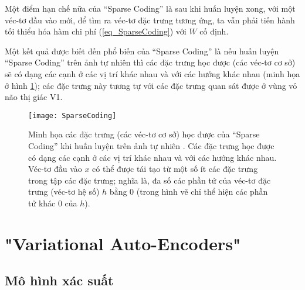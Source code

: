 Một điểm hạn chế nữa của ``Sparse Coding'' là sau khi huấn luyện xong, với một véc-tơ đầu vào mới, để tìm ra véc-tơ đặc trưng tương ứng, ta vẫn phải tiến hành tối thiểu hóa hàm chi phí (\ref{eq_SparseCoding}) với $W$ cố định.

Một kết quả được biết đến phổ biến của ``Sparse Coding'' là nếu huấn luyện ``Sparse Coding'' trên ảnh tự nhiên thì các đặc trưng học được (các véc-tơ cơ sở) sẽ có dạng các cạnh  ở các vị trí khác nhau và với các hướng khác nhau (minh họa ở hình \ref{fig_SparseCoding}); các đặc trưng này tương tự với các đặc trưng quan sát được ở vùng vỏ não thị giác V1. 

\begin{figure} 
	\centering
	\texttt{[image: SparseCoding]}
	\caption[Minh họa các đặc trưng học được của ``Sparse Coding'' khi huấn luyện trên ảnh tự nhiên]{Minh họa các đặc trưng (các véc-tơ cơ sở) học được của ``Sparse Coding'' khi huấn luyện trên ảnh tự nhiên \cite{zeiler2014thesis}. Các đặc trưng học được có dạng các cạnh ở các vị trí khác nhau và với các hướng khác nhau. Véc-tơ đầu vào $x$ có thể được tái tạo từ một số ít các đặc trưng trong tập các đặc trưng; nghĩa là, đa số các phần tử của véc-tơ đặc trưng (véc-tơ hệ số) $h$ bằng 0 (trong hình vẽ chỉ thể hiện các phần tử khác 0 của $h$).}
	\label{fig_SparseCoding}
\end{figure}
\section{"Variational Auto-Encoders"}
\subsection{Mô hình xác suất}
